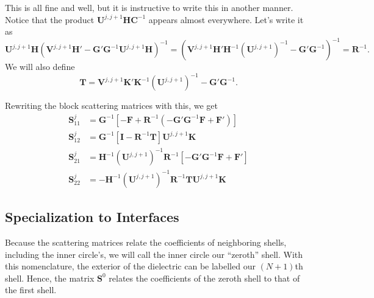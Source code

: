 This is all fine and well, but it is instructive to write this 
in another manner. Notice that the product $\mathbf{U}^{j,j+1}\mathbf{HC}^{-1}$ 
appears almost everywhere. Let's write it as
  \begin{equation}
   \mathbf{U}^{j,j+1}\mathbf{H}\left(\mathbf{V}^{j,j+1}\mathbf{H}'-\mathbf{G}'\mathbf{G}^{-1}\mathbf{U}^{j,j+1}\mathbf{H}\right)^{-1}
    = 
    \left(\mathbf{V}^{j,j+1}\mathbf{H}'\mathbf{H}^{-1}(\mathbf{U}^{j,j+1})^{-1}-\mathbf{G}'\mathbf{G}^{-1}\right)^{-1} = \mathbf{R}^{-1}.
  \end{equation}
We will also define
  \begin{equation}
    \mathbf{T} = \mathbf{V}^{j,j+1}\mathbf{K}'\mathbf{K}^{-1}(\mathbf{U}^{j,j+1})^{-1}-\mathbf{G}'\mathbf{G}^{-1}.
  \end{equation}

Rewriting the block scattering matrices with this, we get
  \begin{subequations}
  \begin{align}
    \mathbf{S}^j_{11}	&= \mathbf{G}^{-1}\left[-\mathbf{F}+\mathbf{R}^{-1}\left(-\mathbf{G}'\mathbf{G}^{-1}\mathbf{F}+\mathbf{F}'\right)\right]	\\
    \mathbf{S}^j_{12}	&= \mathbf{G}^{-1}\left[\mathbf{I}-\mathbf{R}^{-1}\mathbf{T}\right]\mathbf{U}^{j,j+1}\mathbf{K}				\\
    \mathbf{S}^j_{21}	&= \mathbf{H}^{-1}(\mathbf{U}^{j,j+1})^{-1}\mathbf{R}^{-1}\left[-\mathbf{G}'\mathbf{G}^{-1}\mathbf{F}+\mathbf{F}'\right]\\
    \mathbf{S}^j_{22}	&= -\mathbf{H}^{-1}(\mathbf{U}^{j,j+1})^{-1}\mathbf{R}^{-1}\mathbf{TU}^{j,j+1}\mathbf{K}
  \end{align}
  \end{subequations}

\subsection{Specialization to Interfaces}
Because the scattering matrices relate the coefficients
of neighboring shells, including the inner circle's, 
we will call the inner circle our ``zeroth'' shell. 
With this nomenclature, the exterior of the dielectric
can be labelled our $(N+1)$th shell. Hence, the matrix
$\mathbf{S}^0$ relates the coefficients of the zeroth shell
to that of the first shell.

